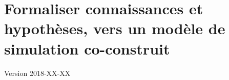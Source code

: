 \documentclass[12pt, a4paper, oneside]{book}
\begin{document}
	\setcounter{part}{0}
	\setcounter{chapter}{1}
	\setcounter{secnumdepth}{4}
		
	\chapter{Formaliser connaissances et hypothèses, vers un modèle de simulation co-construit}
	\begin{center}
		{\large Version 2018-XX-XX}
	\end{center}

	
\end{document}
